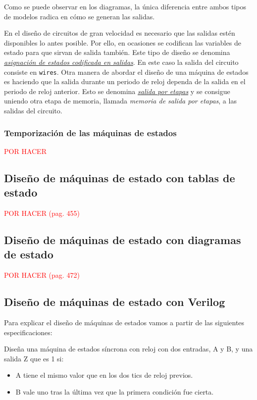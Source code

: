 Como se puede observar en los diagramas, la única diferencia entre ambos tipos de modelos radica en cómo se generan las salidas. 

En el diseño de circuitos de gran velocidad es necesario que las salidas estén disponibles lo antes posible. Por ello, en ocasiones se codifican las variables de estado para que sirvan de salida también. Este tipo de diseño se denomina \hyperlink{output-coded_state_assignment}{\emph{asignación de estados codificada en salidas}}. En este caso la salida del circuito consiste en \verb|wires|. Otra manera de abordar el diseño de una máquina de estados es haciendo que la salida durante un periodo de reloj dependa de la salida en el periodo de reloj anterior. Esto se denomina \hyperlink{pipelined_outputs}{\emph{salida por etapas}} y se consigue uniendo otra etapa de memoria, llamada \emph{memoria de salida por etapas}, a las salidas del circuito.

\subsubsection{Temporización de las máquinas de estados}

\textcolor{red}{POR HACER}

\subsection{Diseño de máquinas de estado con tablas de estado}

\textcolor{red}{POR HACER (pag. 455)}

\subsection{Diseño de máquinas de estado con diagramas de estado}

\textcolor{red}{POR HACER (pag. 472)}

\subsection{Diseño de máquinas de estado con Verilog}

Para explicar el diseño de máquinas de estados vamos a partir de las siguientes especificaciones:

Diseña una máquina de estados síncrona con reloj con dos entradas, A y B, y una salida Z que es 1 si:

\begin{itemize}
    \item A tiene el mismo valor que en los dos tics de reloj previos.
    \item B vale uno tras la última vez que la primera condición fue cierta.
\end{itemize}

